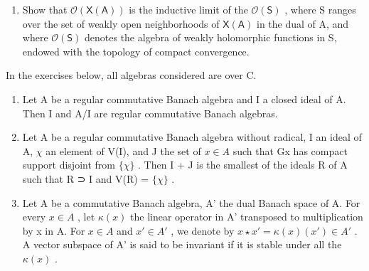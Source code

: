 \begin{enumerate}
\def\labelenumi{\alph{enumi})}
\setcounter{enumi}{4}
\tightlist
\item
  Show that \(\mathcal{O}(\mathsf{X}(\mathsf{A}))\) is the inductive limit of the \(\mathcal{O}(\mathsf{S})\) , where S ranges over the set of weakly open neighborhoods of \(\mathsf{X}(\mathsf{A})\) in the dual of A, and where \(\mathcal{O}(\mathsf{S})\) denotes the algebra of weakly holomorphic functions in S, endowed with the topology of compact convergence.
\end{enumerate}


In the exercises below, all algebras considered are over C.

\begin{enumerate}
\def\labelenumi{\arabic{enumi})}
\item
  Let A be a regular commutative Banach algebra and I a closed ideal of A. Then I and A/I are regular commutative Banach algebras.
\item
  Let A be a regular commutative Banach algebra without radical, I an ideal of A, \(\chi\) an element of V(I), and J the set of \(x \in A\) such that Gx has compact support disjoint from \(\{\chi\}\) . Then I + J is the smallest of the ideals R of A such that R ⊃ I and V(R) = \(\{\chi\}\) .
\item
  Let A be a commutative Banach algebra, A' the dual Banach space of A. For every \(x \in A\) , let \(\kappa(x)\) the linear operator in A' transposed to multiplication by x in A. For \(x \in A\) and \(x' \in A'\) , we denote by \(x \star x' = \kappa(x)(x') \in A'\) . A vector subspace of A' is said to be invariant if it is stable under all the \(\kappa(x)\) .
\end{enumerate}

